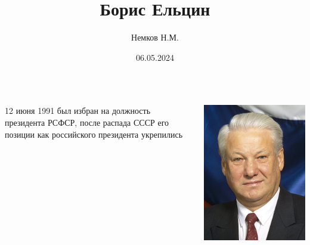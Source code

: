 

\title{Борис Ельцин}
\author{Немков Н.М.}
\date{06.05.2024}



\begin{frame}
\maketitle
\end{frame}


\begin{frame}{}
	\begin{columns}
		\begin{column}{0.45\textwidth}

			12 июня 1991 был избран на должность президента РСФСР, после распада СССР его позиции как российского президента укрепились

		\end{column}


		\begin{column}{0.45\textwidth}

			\includegraphics[width=1\textwidth]{images/elcin-1}

		\end{column}
	\end{columns}
\end{frame}

